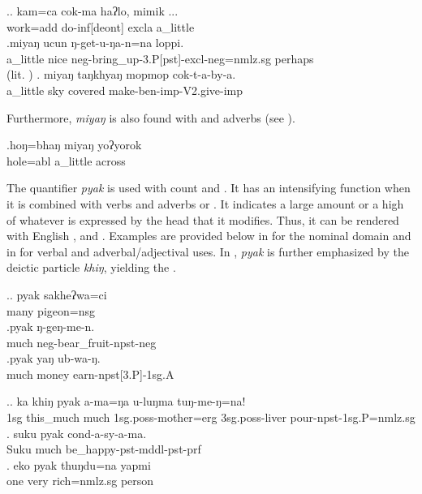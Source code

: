 \ex.\ag. kam=ca cok-ma     haʔlo, mimik ... \\
work{\sc =add} do{\sc -inf[deont]} {\sc excla} a\_little  \\
  
\bg.miyaŋ ucun ŋ-get-u-ŋa-n=na         loppi.\\
a\_little nice {\sc neg-}bring\_up{\sc -3.P[pst]-excl-neg=nmlz.sg} perhaps\\
 (lit. )  
 \bg. miyaŋ taŋkhyaŋ mopmop  cok-t-a-by-a.\\
a\_little  sky covered make{\sc -ben-imp-V2.give-imp}\\
  

 Furthermore, \emph{miyaŋ} is also found with  and  adverbs (see \Next).
 
 \exg.hoŋ=bhaŋ   miyaŋ yoʔyorok\\
 hole{\sc =abl} a\_little across\\
  

The quantifier \emph{pyak} is used with count and . It has an intensifying function when it is combined with verbs and adverbs or . It indicates a large amount or a high  of whatever is expressed by the head that it modifies. Thus, it can be rendered with  English ,  and . Examples are provided below in \Next for the nominal domain and in \NNext for verbal and adverbal/adjectival uses. In \NNext[a], \emph{pyak} is further emphasized by the deictic  particle \emph{khiŋ}, yielding the  .

\ex.\ag. pyak  sakheʔwa=ci\\
many pigeon{\sc =nsg}\\
 
\bg.pyak  ŋ-geŋ-me-n.\\
much {\sc neg-}bear\_fruit{\sc [3sg]-npst-neg}\\
  
\bg.pyak  yaŋ  ub-wa-ŋ.\\
much money earn{\sc -npst[3.P]-1sg.A} \\
  

\ex.\ag.   ka  khiŋ     pyak  a-ma=ŋa   u-luŋma   tuŋ-me-ŋ=na!\\
{\sc 1sg} this\_much much {\sc 1sg.poss-}mother{\sc =erg} {\sc 3sg.poss-}liver pour{\sc -npst-1sg.P=nmlz.sg}\\
  
\bg. suku   pyak  cond-a-sy-a-ma.\\
Suku much be\_happy{\sc [3sg]-pst-mddl-pst-prf}\\
  
\bg.   eko pyak thuŋdu=na        yapmi\\
one very rich{\sc =nmlz.sg} person\\
  


